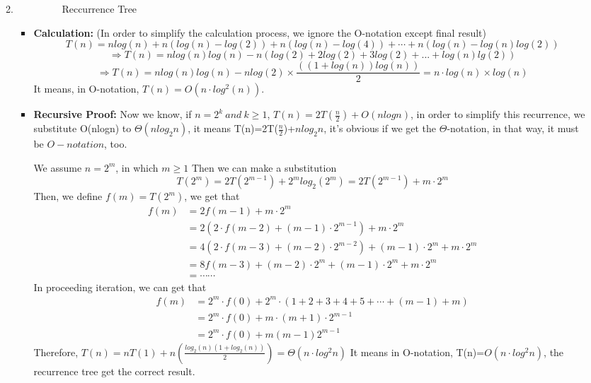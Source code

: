 \documentclass[12pt,a4paper]{article}
\makeatletter
\newtheorem*{solution}{Solution}
\theoremstyle{definition}
\renewenvironment{solution}[1][Solution] {\par\pushQED{\qed}\normalfont\topsep6\p@\@plus6\p@\relax\trivlist\item[\hskip\labelsep\bfseries#1\@addpunct{.}]\ignorespaces}{\popQED\endtrivlist\@endpefalse} \makeatother
\makeatother
\begin{document}
\begin{enumerate}
\begin{enumerate}
\begin{solution}
\begin{itemize}
\begin{figure}[htbp]
            \caption{Reccurrence Tree}\label{Recurrence}
            \end{figure}\item
            \textbf{Calculation:} (In order to simplify the calculation process, we ignore the O-notation except 
            final result)
            $$T(n)=nlog(n)+n(log(n)-log(2))+n(log(n)-log(4))+\cdots+n(log(n)-log(n)log(2))$$
            $$\Rightarrow T(n)=nlog(n)log(n)-n(log(2)+2log(2)+3log(2)+...+log(n)lg(2))$$
            $$\Rightarrow T(n)=nlog(n)log(n)-nlog(2)\times \frac{((1+log(n))log(n))}{2}=n\cdot log(n)\times log(n)$$
            It means, in O-notation, $T(n)=O(n \cdot log^2(n))$.
            \item \textbf{Recursive Proof:} 
            Now we know, if $n=2^k\ and \ k\geq 1$, $T(n)=2T(\frac{n}{2})+O(nlogn)$, in order to simplify this recurrence, we substitute O(nlogn) to $\Theta(nlog_2n)$, it means T(n)=2T($\frac{n}{2}$)+$nlog_2n$, it's obvious if we get the $\Theta$-notation, in that way, it must be $O-notation$, too.\par
            We assume $n=2^m$, in which $m\geq 1$ Then we can make a substitution
            $$T(2^m)=2T(2^{m-1})+2^mlog_2(2^m)=2T(2^{m-1})+m\cdot 2^m$$
            Then, we define $f(m)=T(2^m)$, we get that
            \begin{align*}  
            f(m) &=  2f(m-1)+m\cdot 2^m 
            \\   &=  2(2\cdot f(m-2)+(m-1)\cdot2^{m-1})+m\cdot 2
            ^m
            \\   &=  4(2\cdot f(m-3)+(m-2)\cdot2^{m-2})+(m-1)\cdot 2^m + m \cdot 2^m
            \\   &=  8f(m-3)+(m-2)\cdot 2^m + (m-1)\cdot 2^m + m \cdot 2^m
            \\   &= \cdots \cdots
            \end{align*}
            In proceeding iteration, we can get that
            \begin{align*}  
            f(m) &=  2^m\cdot f(0)+2^m\cdot (1+2+3+4+5+\cdots+(m-1) +m)
            \\   &=  2^m\cdot f(0)+m\cdot (m+1)\cdot 2^{m-1}
            \\   &=  2^m\cdot f(0)+m(m-1)2^{m-1}
            \end{align*}
            Therefore, $T(n)=nT(1)+n(\frac{log_2(n)(1+log_2(n))}{2})=\Theta(n\cdot log^2n)$
            It means in O-notation, T(n)=$O(n\cdot log^2n)$, the recurrence tree get the correct result.
            \end{itemize}
        \end{solution}


\end{enumerate}
\end{enumerate}
\end{document}
